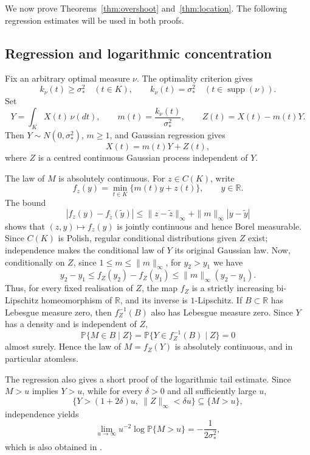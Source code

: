 \documentclass[11pt]{amsart}
\theoremstyle{definition}
\theoremstyle{remark}
\providecommand{\supp}{\operatorname{supp}}
\newcommand{\Pp}{\mathbb P}
\begin{document}
We now prove Theorems~\ref{thm:overshoot} and~\ref{thm:location}.  The
following regression estimates will be used in both proofs.

\subsection{Regression and logarithmic concentration}
\label{subsec:regr}

Fix an arbitrary optimal measure $\nu$.  The optimality criterion gives
\begin{equation}
 k_\nu(t)\geq\sigma_*^2 \quad(t\in K),
 \qquad
 k_\nu(t)=\sigma_*^2 \quad(t\in\supp(\nu)).
 \label{eq:frostman}
\end{equation}
Set
\[
 Y=\int_KX(t)\,\nu(dt),
 \qquad
 m(t)=\frac{k_\nu(t)}{\sigma_*^2},
 \qquad
 Z(t)=X(t)-m(t)Y.
\]
Then $Y\sim N(0,\sigma_*^2)$, $m\geq1$, and Gaussian regression gives
\begin{equation}
 X(t)=m(t)Y+Z(t),
 \label{eq:regression}
\end{equation}
where $Z$ is a centred continuous Gaussian process independent of $Y$.

The law of $M$ is absolutely continuous.  For $z\in C(K)$, write
\[
 f_z(y)=\min_{t\in K}\{m(t)y+z(t)\},\qquad y\in\mathbb R.
\]
The bound
\[
 |f_z(y)-f_{\widetilde z}(\widetilde y)|
 \leq \|z-\widetilde z\|_\infty
      +\|m\|_\infty|y-\widetilde y|
\]
shows that $(z,y)\mapsto f_z(y)$ is jointly continuous and hence Borel
measurable.  Since $C(K)$ is Polish, regular conditional distributions
given $Z$ exist; independence makes the conditional law of $Y$ its
original Gaussian law.  Now, conditionally on $Z$, since
$1\leq m\leq\|m\|_\infty$, for $y_2>y_1$ we have
\[
 y_2-y_1\leq f_Z(y_2)-f_Z(y_1)
 \leq\|m\|_\infty(y_2-y_1).
\]
Thus, for every fixed realisation of $Z$, the map $f_Z$ is a strictly
increasing bi-Lipschitz homeomorphism of $\mathbb R$, and its inverse is
$1$-Lipschitz.  If $B\subset\mathbb R$ has Lebesgue measure zero, then
$f_Z^{-1}(B)$ also has Lebesgue measure zero.  Since $Y$ has a density
and is independent of $Z$,
\[
 \Pp\{M\in B\mid Z\}
 =\Pp\{Y\in f_Z^{-1}(B)\mid Z\}=0
\]
almost surely.  Hence the law of $M=f_Z(Y)$ is absolutely continuous,
and in particular atomless.

The regression also gives a short proof of the logarithmic tail estimate.
Since $M>u$ implies $Y>u$, while for every $\delta>0$ and all
sufficiently large $u$,
\[
 \{Y>(1+2\delta)u,\ \|Z\|_\infty<\delta u\}
 \subseteq\{M>u\},
\]
independence yields
\begin{equation}
 \lim_{u\to\infty}u^{-2}\log\Pp\{M>u\}
 =-\frac1{2\sigma_*^2},
 \label{eq:ldp}
\end{equation}
which is also obtained in \cite[Theorem~5.1]{adler2014existence}.
\end{document}
